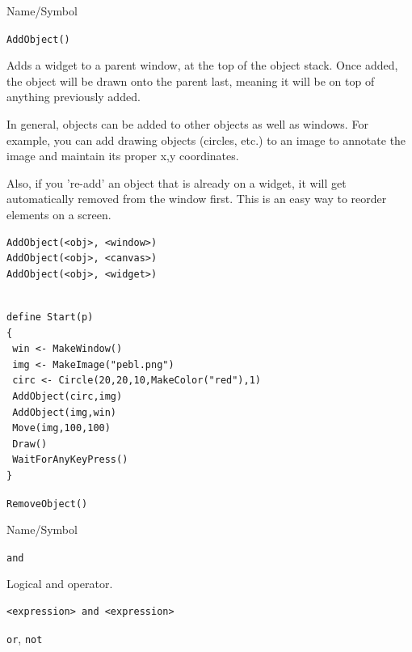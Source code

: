 \begin{desc}{Name/Symbol}

\item[Name/Symbol]  	\verb+AddObject()+

\item[Description] 	Adds a widget to a parent window, at the top of the object stack.  Once added, the object will be drawn onto the parent last, meaning it will be on top of anything previously added. 

In general, objects can be added to other objects as well as windows.  For example, you can add drawing objects (circles, etc.) to an image to annotate the image and maintain its proper x,y coordinates.

Also, if you 're-add' an object that is already on a widget, it will get automatically removed from the window first.  This is an easy way to reorder elements on a screen.

\begin{verbatim}
AddObject(<obj>, <window>)
AddObject(<obj>, <canvas>)
AddObject(<obj>, <widget>)
\end{verbatim}

\item[Example]
\begin{verbatim}

define Start(p)
{
 win <- MakeWindow()
 img <- MakeImage("pebl.png")
 circ <- Circle(20,20,10,MakeColor("red"),1)
 AddObject(circ,img)
 AddObject(img,win)
 Move(img,100,100)
 Draw()
 WaitForAnyKeyPress()
}
\end{verbatim}



\item[See Also]    	\verb+RemoveObject()+
\end{desc}





\begin{desc}{Name/Symbol}
\item[Name/Symbol]  	\verb+and+
  
\item[Description]  	Logical and operator.

\item[Usage]       	
\begin{verbatim}
<expression> and <expression>
\end{verbatim}

\item[Example]	

\item[See Also]     	\verb+or+, \verb+not+

\end{desc}




